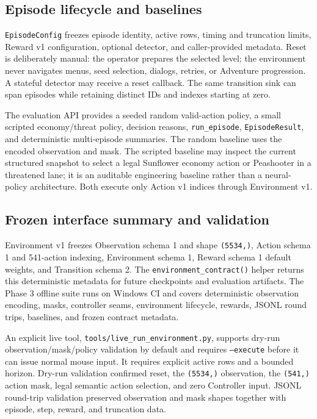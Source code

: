 \documentclass[11pt,a4paper]{article}
\begin{document}
\subsection{Episode lifecycle and baselines}
\texttt{EpisodeConfig} freezes episode identity, active rows, timing and truncation limits, Reward v1 configuration, optional detector, and caller-provided metadata. Reset is deliberately manual: the operator prepares the selected level; the environment never navigates menus, seed selection, dialogs, retries, or Adventure progression. A stateful detector may receive a reset callback. The same transition sink can span episodes while retaining distinct IDs and indexes starting at zero.

The evaluation API provides a seeded random valid-action policy, a small scripted economy/threat policy, decision reasons, \texttt{run\_episode}, \texttt{EpisodeResult}, and deterministic multi-episode summaries. The random baseline uses the encoded observation and mask. The scripted baseline may inspect the current structured snapshot to select a legal Sunflower economy action or Peashooter in a threatened lane; it is an auditable engineering baseline rather than a neural-policy architecture. Both execute only Action v1 indices through Environment v1.

\subsection{Frozen interface summary and validation}
Environment v1 freezes Observation schema 1 and shape \texttt{(5534,)}, Action schema 1 and 541-action indexing, Environment schema 1, Reward schema 1 default weights, and Transition schema 2. The \texttt{environment\_contract()} helper returns this deterministic metadata for future checkpoints and evaluation artifacts. The Phase 3 offline suite runs on Windows CI and covers deterministic observation encoding, masks, controller seams, environment lifecycle, rewards, JSONL round trips, baselines, and frozen contract metadata.

An explicit live tool, \texttt{tools/live\_run\_environment.py}, supports dry-run observation/mask/policy validation by default and requires \texttt{--execute} before it can issue normal mouse input. It requires explicit active rows and a bounded horizon. Dry-run validation confirmed reset, the \texttt{(5534,)} observation, the \texttt{(541,)} action mask, legal semantic action selection, and zero Controller input. JSONL round-trip validation preserved observation and mask shapes together with episode, step, reward, and truncation data.
\end{document}
